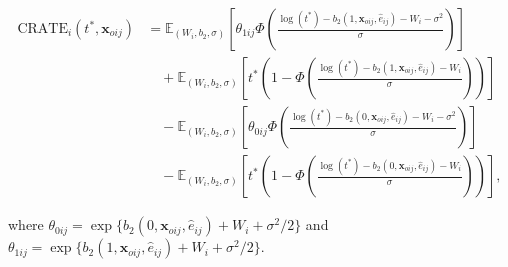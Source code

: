 \documentclass[aoas]{imsart}
\theoremstyle{plain}
\theoremstyle{definition}
\begin{document}






\begin{align}\nonumber
{\text{CRATE}_i}(t^*, \mathbf{x}_{oij}) &= \mathbb{E}_{(W_i,b_2,\sigma)}\left[\theta_{1ij} \Phi\left(\frac{\log(t^*) - b_2(1, \mathbf{x}_{oij}, \hat{e}_{ij}) - W_i-\sigma^2}{\sigma}\right)\right] \\ \nonumber
&\quad + \mathbb{E}_{(W_i,b_2,\sigma)}\left[t^* \left(1 - \Phi(\frac{\log(t^*) - b_2(1, \mathbf{x}_{oij}, \hat{e}_{ij}) - W_i} {\sigma})\right) \right]\\ \nonumber
&\quad -\mathbb{E}_{(W_i,b_2,\sigma)} \left[ \theta_{0ij} \Phi\left(\frac{\log(t^*) - b_2(0, \mathbf{x}_{oij}, \hat{e}_{ij}) - W_i-\sigma^2}{\sigma}\right) \right]  \\ \nonumber
&\quad - \mathbb{E}_{(W_i,b_2,\sigma)} \left[t^* \left(1 - \Phi(\frac{\log(t^*) - b_2(0, \mathbf{x}_{oij}, \hat{e}_{ij}) - W_i}{\sigma})\right)\right], 
\end{align}\label{eq:CRATEexpr}

\noindent where $\theta_{0ij} = \exp\{b_2(0, \mathbf{x}_{oij}, \hat{e}_{ij}) + W_i + \sigma^2/2\}$ and  $\theta_{1ij} = \exp\{b_2(1, \mathbf{x}_{oij}, \hat{e}_{ij}) + W_i + \sigma^2/2\}$.
\end{document}
